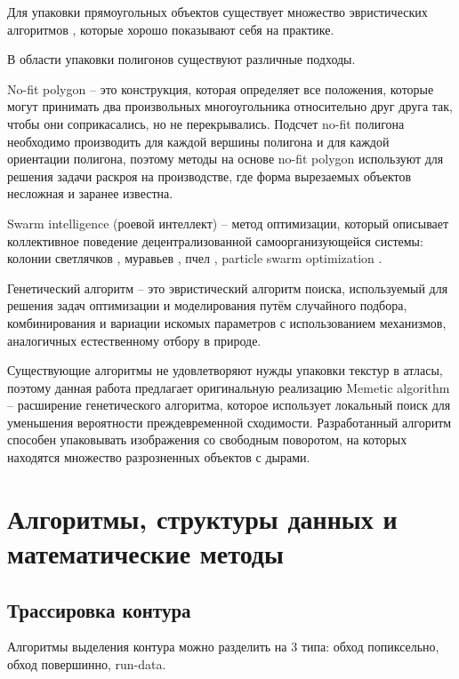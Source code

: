 \documentclass{fefu_thesis/cls/fefu}
\begin{document}
    Для упаковки прямоугольных объектов существует множество эвристических алгоритмов \cite{ThousandWayToPackBin}, которые хорошо показывают себя на практике.

    В области упаковки полигонов существуют различные подходы.

    No-fit polygon \cite{NofitPolygon}\cite{NofitPolygon2} -- это конструкция, которая определяет все положения, которые могут принимать два произвольных многоугольника относительно друг друга так, чтобы они соприкасались, но не перекрывались. Подсчет no-fit полигона необходимо производить для каждой вершины полигона и для каждой ориентации полигона, поэтому методы на основе no-fit polygon используют для решения задачи раскроя на производстве, где форма вырезаемых объектов несложная и заранее известна.

    Swarm intelligence (роевой интеллект) -- метод оптимизации, который описывает коллективное поведение децентрализованной самоорганизующейся системы: колонии светлячков \cite{FireFly}, муравьев \cite{AntColony}, пчел \cite{PlayrixArticle}, particle swarm optimization \cite{PSO}.

    Генетический алгоритм \cite{JAKOBS1996165} -- это эвристический алгоритм поиска, используемый для решения задач оптимизации и моделирования путём случайного подбора, комбинирования и вариации искомых параметров с использованием механизмов, аналогичных естественному отбору в природе.

    Существующие алгоритмы не удовлетворяют нужды упаковки текстур в атласы, поэтому данная работа предлагает оригинальную реализацию Memetic algorithm \cite{WhatIsMemetic} -- расширение генетического алгоритма, которое использует локальный поиск для уменьшения вероятности преждевременной сходимости. Разработанный алгоритм способен упаковывать изображения со свободным поворотом, на которых находятся множество разрозненных объектов с дырами.
    \pagebreak
    \section{Алгоритмы, структуры данных и математические методы}

    \subsection{Трассировка контура}
    Алгоритмы выделения контура можно разделить на 3 типа: обход попиксельно, обход повершинно, run-data.
\end{document}
